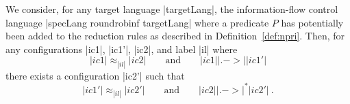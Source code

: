 \begin{lemma}
  \label{lemma:rr-tsni-general}
  We consider, for any target language |targetLang|,
  the information-flow control
  language |specLang roundrobinf targetLang| where a predicate $P$
  has potentially been added to the reduction rules as described in
  Definition~\ref{def:npri}.  Then,
  for any configurations |ic1|, |ic1'|, |ic2|, and label |il| where
  \begin{equation} \label{eq:tsni-lemma-lhs}
  |ic1| \approx_{|il|} |ic2|
  \qquad \text{and} \qquad
  |ic1| |.->| |ic1'|
  \end{equation}
  there exists a configuration |ic2'| such that
  \begin{equation} \label{eq:tsni-lemma-rhs}
  |ic1'| \approx_{|il|} |ic2'|
  \qquad \text{and} \qquad
  |ic2| |.->|^* |ic2'|
  \ \text{.}
  \end{equation}
\end{lemma}

